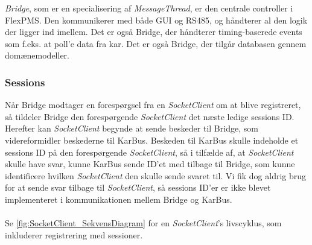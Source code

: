 \textit{Bridge}, som er en specialisering af \textit{MessageThread}, er den centrale controller i FlexPMS. Den kommunikerer med både GUI og RS485, og håndterer al den logik der ligger ind imellem. Det er også Bridge, der håndterer timing-baserede events som f.eks. at poll'e data fra kar. Det er også Bridge, der tilgår databasen gennem domænemodeller.


\subsubsection{Sessions}
Når Bridge modtager en forespørgsel fra en \textit{SocketClient} om at blive registreret, så tildeler Bridge den forespørgende \textit{SocketClient} det næste ledige sessions ID. Herefter kan \textit{SocketClient} begynde at sende beskeder til Bridge, som videreformidler beskederne til KarBus. Beskeden til KarBus skulle indeholde et sessions ID på den forespørgende \textit{SocketClient}, så i tilfælde af, at \textit{SocketClient} skulle have svar, kunne KarBus sende ID’et med tilbage til Bridge, som kunne identificere hvilken \textit{SocketClient} den skulle sende svaret til. Vi fik dog aldrig brug for at sende svar tilbage til \textit{SocketClient}, så sessions ID'er er ikke blevet implementeret i kommunikationen mellem Bridge og KarBus.\\\\

Se \ref{fig:SocketClient_SekvensDiagram} for en \textit{SocketClient}'s livscyklus, som inkluderer registrering med sessioner.

